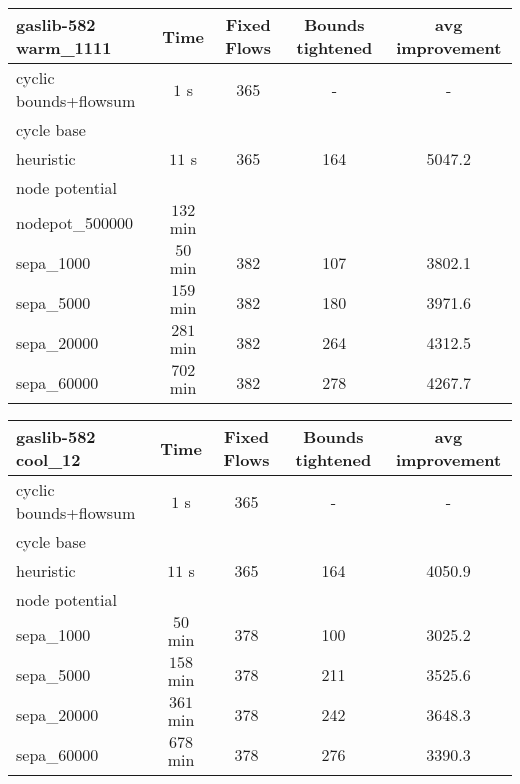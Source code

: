 \begin{center}
\begin{tabular}{ l | c | c | c | c }
\textbf{gaslib-582 warm\_1111} & Time  & Fixed Flows & Bounds tightened & avg improvement \\
\hline
 cyclic bounds+flowsum& $1$ s& 365 & - & -\\
 cycle base& $ $ &  &  &\\
 heuristic& $ 11$ s& 365& 164 & 5047.2 \\
 node potential& $ $ &  &  &   \\ 
 nodepot\_500000& $132$ min &  &  &   \\ 
 sepa\_1000& $ 50$ min & 382 & 107 & 3802.1 \\
 sepa\_5000& $ 159$ min & 382 & 180 & 3971.6 \\
 sepa\_20000& $ 281$ min & 382 & 264 & 4312.5 \\
 sepa\_60000& $702$ min  & 382& 278& 4267.7\\
\end{tabular} 
\end{center}

\begin{center}
\begin{tabular}{ l | c | c | c | c }

\textbf{gaslib-582 cool\_12} & Time  & Fixed Flows & Bounds tightened & avg improvement\\
\hline
 cyclic bounds+flowsum& $1$ s & 365 & - & - \\
 cycle base& $ $ &  &  & \\
 heuristic& $11$ s & 365 & 164 & 4050.9 \\
 node potential& $ $ &  &  &    \\ 
 sepa\_1000& $ 50$ min  & 378 & 100 & 3025.2\\
 sepa\_5000& $ 158$ min & 378 & 211 & 3525.6\\ 
 sepa\_20000& $ 361$ min & 378 & 242 & 3648.3  \\
 sepa\_60000& $678$ min  & 378 & 276 & 3390.3 \\
\end{tabular} 
\end{center}

